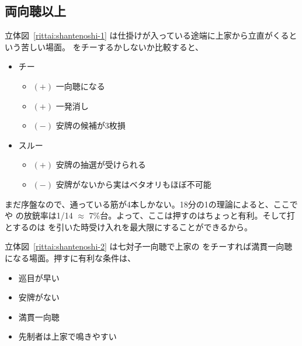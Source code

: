 \documentclass[../nankiru_main.tex]{subfiles}
\begin{document}
\subsection{両向聴以上}

立体図~\ref{rittai:shantenoshi-1} は仕掛けが入っている途端に上家から立直がくるという苦しい場面。 をチーするかしないか比較すると、

\begin{itemize}
  \item {} チー
  \begin{itemize}
    \item $(+)$ 一向聴になる
    \item $(+)$ 一発消し
    \item $(-)$ 安牌の候補が3枚損
  \end{itemize}
  \item スルー
  \begin{itemize}
    \item $(+)$ 安牌の抽選が受けられる
    \item $(-)$ 安牌がないから実はベタオリもほぼ不可能
  \end{itemize}
\end{itemize}

まだ序盤なので、通っている筋が4本しかない。18分の1の理論によると、ここで  や  の放銃率は1/14 $\approx$ 7\%台。よって、ここは押すのはちょっと有利。そして打  とするのは  を引いた時受け入れを最大限にすることができるから\citep[][pp.~156--157]{fkt}。

\begin{rittai}[hbt]
  \centering
  \caption{上家が  で立直を宣言する瞬間}
  \label{rittai:shantenoshi-1}
\end{rittai}

立体図~\ref{rittai:shantenoshi-2} は七対子一向聴で上家の  をチーすれば満貫一向聴になる場面。押すに有利な条件は、

\begin{itemize}
\item 巡目が早い
\item 安牌がない
\item 満貫一向聴
\item 先制者は上家で鳴きやすい
\end{itemize}
\end{document}
